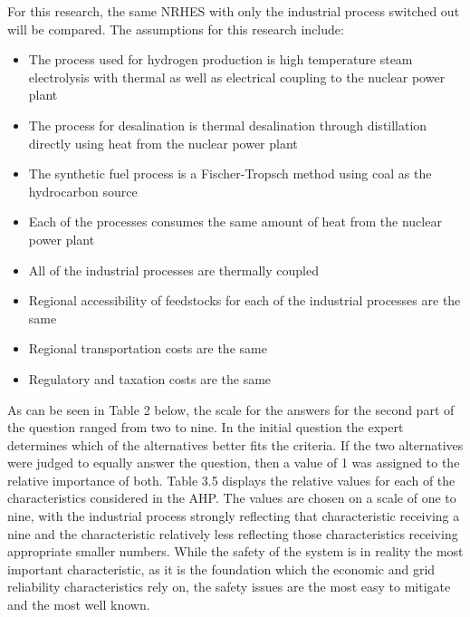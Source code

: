\documentclass[12pt]{UIdahoMastersThesis}
\begin{document}
 For this research, the same NRHES with only the industrial process switched out will be compared. The assumptions for this research include:
\begin{itemize}
\item The process used for hydrogen production is high temperature steam electrolysis with thermal as well as electrical coupling to the nuclear power plant  
\item  The process for desalination is thermal desalination through distillation directly using heat from the nuclear power plant   
\item The synthetic fuel process is a Fischer-Tropsch method using coal as the hydrocarbon source
\item Each of the processes consumes the same amount of heat from the nuclear power plant
\item All of the industrial processes are thermally coupled
\item Regional accessibility of feedstocks for each of the industrial processes are the same
\item Regional transportation costs are the same
\item Regulatory and taxation costs are the same
\end{itemize}
 
As can be seen in Table 2 below, the scale for the answers for the second part of the question ranged from two to  nine.  In the initial question the expert determines which of the alternatives better fits the criteria.  If the two alternatives were judged to equally answer the question, then a value of 1 was assigned to the relative importance of both. Table 3.5 displays the relative values for each of the characteristics considered in the AHP. The values are chosen on a scale of one to nine, with the industrial process strongly reflecting that characteristic receiving a nine and the characteristic relatively less reflecting those characteristics receiving appropriate smaller numbers. While the safety of the system is in reality the most important characteristic, as it is the foundation which the economic and grid reliability characteristics rely on, the safety issues are the most easy to mitigate and the most well known. 
\end{document}
